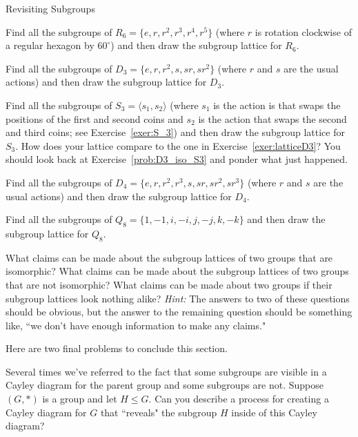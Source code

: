 \begin{section}{Revisiting Subgroups}
\begin{exercise}
Find all the subgroups of $R_6=\{e,r,r^2,r^3,r^4,r^5\}$ (where $r$ is rotation clockwise of a regular hexagon by $60^{\circ}$) and then draw the subgroup lattice for $R_6$.
\end{exercise}

\begin{exercise}\label{exer:latticeD3}
Find all the subgroups of $D_3=\{e,r,r^2,s,sr,sr^2\}$ (where $r$ and $s$ are the usual actions) and then draw the subgroup lattice for $D_3$.
\end{exercise}

\begin{exercise}
Find all the subgroups of $S_3=\langle s_1, s_2\rangle$ (where $s_1$ is the action is that swaps the positions of the first and second coins and $s_2$ is the action that swaps the second and third coins; see Exercise~\ref{exer:S_3}) and then draw the subgroup lattice for $S_3$. How does your lattice compare to the one in Exercise~\ref{exer:latticeD3}? You should look back at Exercise~\ref{prob:D3_iso_S3} and ponder what just happened.
\end{exercise}

\begin{exercise}
Find all the subgroups of $D_4=\{e,r,r^2,r^3,s,sr,sr^2,sr^3\}$ (where $r$ and $s$ are the usual actions) and then draw the subgroup lattice for $D_4$.
\end{exercise}

\begin{exercise}
Find all the subgroups of $Q_8=\{1,-1,i,-i,j,-j,k,-k\}$ and then draw the subgroup lattice for $Q_8$.
\end{exercise}

\begin{problem}
What claims can be made about the subgroup lattices of two groups that are isomorphic? What claims can be made about the subgroup lattices of two groups that are not isomorphic?  What claims can be made about two groups if their subgroup lattices look nothing alike?  \emph{Hint:} The answers to two of these questions should be obvious, but the answer to the remaining question should be something like, ``we don't have enough information to make any claims."
\end{problem}

Here are two final problems to conclude this section.

\begin{problem}
Several times we've referred to the fact that some subgroups are visible in a Cayley diagram for the parent group and some subgroups are not.  Suppose $(G,*)$ is a group and let $H\leq G$.  Can you describe a process for creating a Cayley diagram for $G$ that ``reveals" the subgroup $H$ inside of this Cayley diagram?
\end{problem}


\end{section}
